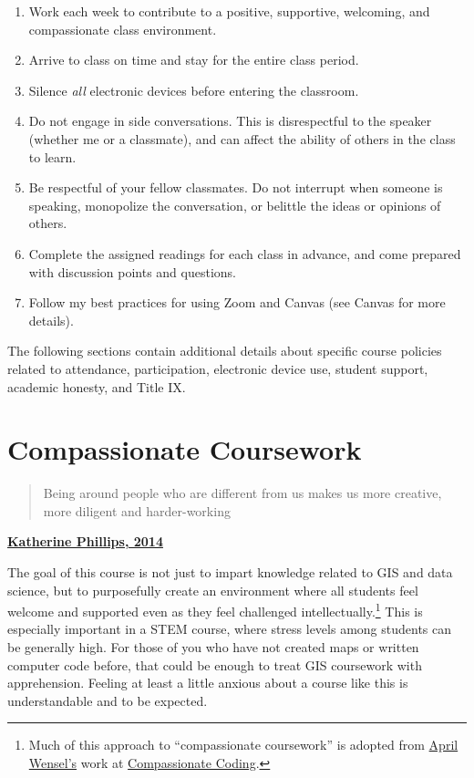 \documentclass[
]{book}
\providecommand{\tightlist}{%
  \setlength{\itemsep}{0pt}\setlength{\parskip}{0pt}}
\begin{document}
\begin{enumerate}
\def\labelenumi{\arabic{enumi}.}
\tightlist
\item
  Work each week to contribute to a positive, supportive, welcoming, and compassionate class environment.
\item
  Arrive to class on time and stay for the entire class period.
\item
  Silence \emph{all} electronic devices before entering the classroom.
\item
  Do not engage in side conversations. This is disrespectful to the speaker (whether me or a classmate), and can affect the ability of others in the class to learn.
\item
  Be respectful of your fellow classmates. Do not interrupt when someone is speaking, monopolize the conversation, or belittle the ideas or opinions of others.
\item
  Complete the assigned readings for each class in advance, and come prepared with discussion points and questions.
\item
  Follow my best practices for using Zoom and Canvas (see Canvas for more details).
\end{enumerate}

The following sections contain additional details about specific course policies related to attendance, participation, electronic device use, student support, academic honesty, and Title IX.

\hypertarget{compassionate-coursework}{%
\section{Compassionate Coursework}\label{compassionate-coursework}}

\begin{quote}
Being around people who are different from us makes us more creative, more diligent and harder-working
\end{quote}

\textbf{\href{https://www.scientificamerican.com/article/how-diversity-makes-us-smarter/}{Katherine Phillips, 2014}}

The goal of this course is not just to impart knowledge related to GIS and data science, but to purposefully create an environment where all students feel welcome and supported even as they feel challenged intellectually.\footnote{Much of this approach to ``compassionate coursework'' is adopted from \href{https://twitter.com/aprilwensel}{April Wensel's} work at \href{https://compassionatecoding.com}{Compassionate Coding}.} This is especially important in a STEM course, where stress levels among students can be generally high. For those of you who have not created maps or written computer code before, that could be enough to treat GIS coursework with apprehension. Feeling at least a little anxious about a course like this is understandable and to be expected.
\end{document}
